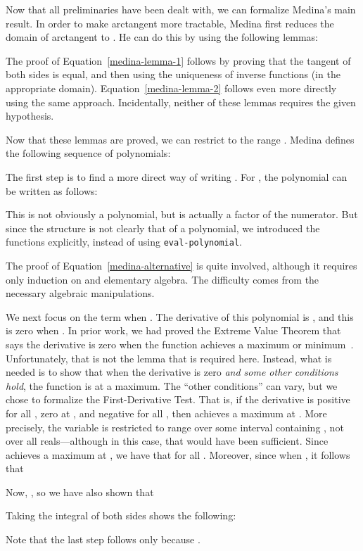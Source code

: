 \documentclass[copyright,creativecommons]{eptcs}
\begin{document}
Now that all preliminaries have been dealt with, we can formalize
Medina's main result. In order to make arctangent more tractable,
Medina first reduces the domain of arctangent to . He can do
this by using the following lemmas:

The proof of Equation~\ref{medina-lemma-1} follows by proving that the
tangent of both sides is equal, and then using the uniqueness of
inverse functions (in the appropriate
domain). Equation~\ref{medina-lemma-2} follows even more directly
using the same approach. Incidentally, neither of these lemmas
requires the given hypothesis.

Now that these lemmas are proved, we can restrict  to the range
. Medina defines the following sequence of polynomials:

The first step is to find a more direct way of writing .  For
, the polynomial can be written as follows:

This is not obviously a polynomial, but  is actually a factor
of the numerator. But since the structure is not clearly that of a
polynomial, we introduced the functions  explicitly, instead of
using \texttt{eval-polynomial}.

The proof of Equation~\ref{medina-alternative} is quite involved,
although it requires only induction on  and elementary algebra.
The difficulty comes from the necessary algebraic manipulations.

We next focus on the term  when . The
derivative of this polynomial is , and this is zero when
. In prior work, we had proved the Extreme Value Theorem that
says the derivative is zero when the function achieves a maximum or
minimum~\cite{Gam:dissertation}. Unfortunately, that is not the lemma
that is required here. Instead, what is needed is to show that when
the derivative is zero \emph{and some other conditions hold}, the
function is at a maximum.  The ``other conditions'' can vary, but we
chose to formalize the First-Derivative Test. That
is, if the derivative is positive for all , zero at , and
negative for all , then  achieves a maximum at .
More precisely, the variable  is restricted to range over some
interval  containing , not over all reals---although in this
case, that would have been sufficient. Since  achieves a
maximum at , we have that  for all .
Moreover, since  when , it follows that

Now, , so we have also shown that 

Taking the integral of both sides shows the following:

Note that the last step follows only because .
\end{document}
